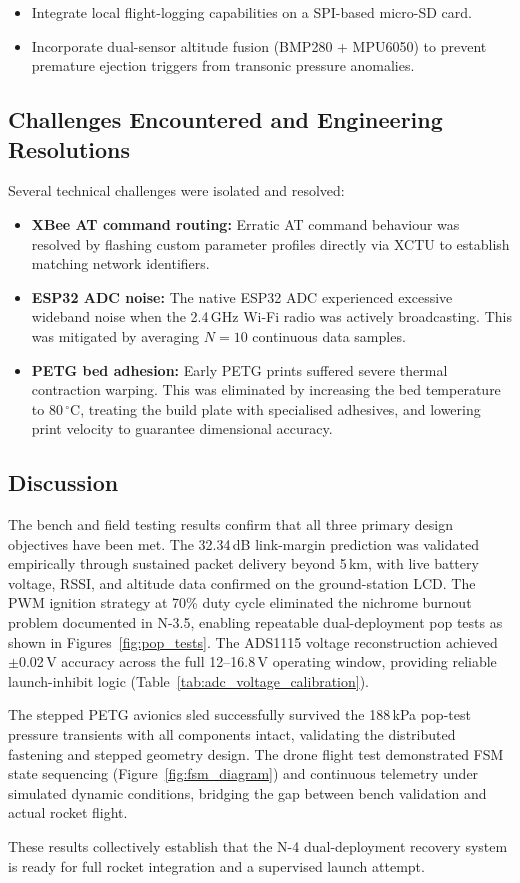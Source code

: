 \begin{itemize}
  \item Integrate local flight-logging capabilities on a SPI-based micro-SD card.
  \item Incorporate dual-sensor altitude fusion (BMP280 + MPU6050) to prevent
    premature ejection triggers from transonic pressure anomalies.
\end{itemize}

\subsection{Challenges Encountered and Engineering Resolutions}

Several technical challenges were isolated and resolved:
\begin{itemize}
  \item \textbf{XBee AT command routing:} Erratic AT command behaviour was
    resolved by flashing custom parameter profiles directly via XCTU to establish
    matching network identifiers.
  \item \textbf{ESP32 ADC noise:} The native ESP32 ADC experienced excessive
    wideband noise when the 2.4\,GHz Wi-Fi radio was actively broadcasting. This
    was mitigated by averaging $N = 10$ continuous data samples.
  \item \textbf{PETG bed adhesion:} Early PETG prints suffered severe thermal
    contraction warping. This was eliminated by increasing the bed temperature to
    80\,$^\circ$C, treating the build plate with specialised adhesives, and
    lowering print velocity to guarantee dimensional accuracy.
\end{itemize}

\subsection{Discussion}

The bench and field testing results confirm that all three primary design
objectives have been met. The 32.34\,dB link-margin prediction was validated
empirically through sustained packet delivery beyond 5\,km, with live battery
voltage, RSSI, and altitude data confirmed on the ground-station LCD. The PWM
ignition strategy at 70\% duty cycle eliminated the nichrome burnout problem
documented in N-3.5, enabling repeatable dual-deployment pop tests as shown in
Figures~\ref{fig:pop_tests}. The ADS1115 voltage reconstruction achieved
$\pm$0.02\,V accuracy across the full 12--16.8\,V operating window, providing
reliable launch-inhibit logic (Table~\ref{tab:adc_voltage_calibration}).

The stepped PETG avionics sled successfully survived the 188\,kPa pop-test
pressure transients with all components intact, validating the distributed
fastening and stepped geometry design. The drone flight test demonstrated FSM
state sequencing (Figure~\ref{fig:fsm_diagram}) and continuous telemetry under
simulated dynamic conditions, bridging the gap between bench validation and
actual rocket flight.

These results collectively establish that the N-4 dual-deployment recovery system
is ready for full rocket integration and a supervised launch attempt.

